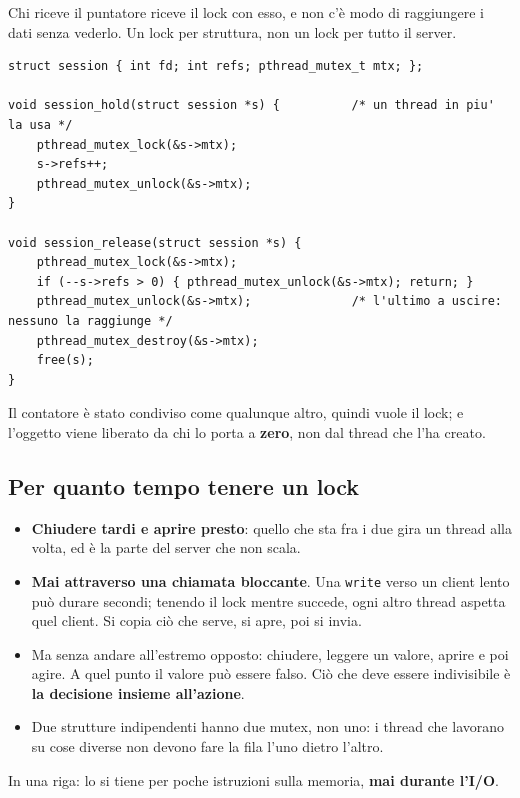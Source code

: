 Chi riceve il puntatore riceve il lock con esso, e non c'è modo di raggiungere i dati senza vederlo. Un lock per struttura,
non un lock per tutto il server.

\begin{lstlisting}[language={[POSIX]C}, style=wnumbers, title={Un oggetto condiviso con un contatore di riferimenti}]
struct session { int fd; int refs; pthread_mutex_t mtx; };

void session_hold(struct session *s) {          /* un thread in piu' la usa */
    pthread_mutex_lock(&s->mtx);
    s->refs++;
    pthread_mutex_unlock(&s->mtx);
}

void session_release(struct session *s) {
    pthread_mutex_lock(&s->mtx);
    if (--s->refs > 0) { pthread_mutex_unlock(&s->mtx); return; }
    pthread_mutex_unlock(&s->mtx);              /* l'ultimo a uscire: nessuno la raggiunge */
    pthread_mutex_destroy(&s->mtx);
    free(s);
}
\end{lstlisting}

Il contatore è stato condiviso come qualunque altro, quindi vuole il lock; e l'oggetto viene liberato da chi lo porta a
\textbf{zero}, non dal thread che l'ha creato.

\subsection{Per quanto tempo tenere un lock}

\begin{itemize}
    \item \textbf{Chiudere tardi e aprire presto}: quello che sta fra i due gira un thread alla volta, ed è la parte del
          server che non scala.
    \item \textbf{Mai attraverso una chiamata bloccante}. Una \texttt{write} verso un client lento può durare secondi; tenendo
          il lock mentre succede, ogni altro thread aspetta quel client. Si copia ciò che serve, si apre, poi si invia.
    \item Ma senza andare all'estremo opposto: chiudere, leggere un valore, aprire e poi agire. A quel punto il valore può essere
          falso. Ciò che deve essere indivisibile è \textbf{la decisione insieme all'azione}.
    \item Due strutture indipendenti hanno due mutex, non uno: i thread che lavorano su cose diverse non devono fare la fila
          l'uno dietro l'altro.
\end{itemize}
In una riga: lo si tiene per poche istruzioni sulla memoria, \textbf{mai durante l'I/O}.

